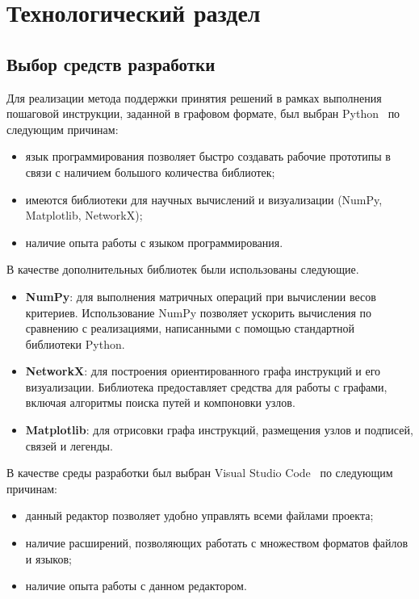 \chapter{Технологический раздел}

\section{Выбор средств разработки}

Для реализации метода поддержки принятия решений в рамках выполнения пошаговой инструкции, заданной в графовом формате, был выбран Python~\cite{python} по следующим причинам:
\begin{itemize}
    \item язык программирования позволяет быстро создавать рабочие прототипы в связи с наличием большого количества библиотек;
    \item имеются библиотеки для научных вычислений и визуализации (NumPy, Matplotlib, NetworkX);
    \item наличие опыта работы с языком программирования.
\end{itemize}

В качестве дополнительных библиотек были использованы следующие.

\begin{itemize}
    \item \textbf{NumPy}: для выполнения матричных операций при вычислении весов критериев. 
    Использование NumPy позволяет ускорить вычисления по сравнению с реализациями, написанными с помощью стандартной библиотеки Python.
    \item \textbf{NetworkX}: для построения ориентированного графа инструкций и его визуализации. 
    Библиотека предоставляет средства для работы с графами, включая алгоритмы поиска путей и компоновки узлов.
    \item \textbf{Matplotlib}: для отрисовки графа инструкций, размещения узлов и подписей, связей и легенды. 
\end{itemize}

В качестве среды разработки был выбран Visual Studio Code~\cite{vscode} по следующим причинам:
\begin{itemize}
    \item данный редактор позволяет удобно управлять всеми файлами проекта;
    \item наличие расширений, позволяющих работать с множеством форматов файлов и языков;
    \item наличие опыта работы с данном редактором.
\end{itemize}

